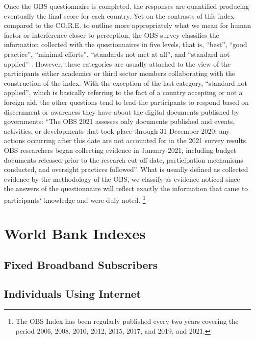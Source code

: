 \documentclass[a4paper, twoside]{report}
\let\oldfootnote\footnote
\renewcommand\footnote[1]{%
\oldfootnote{\hspace{2mm}#1}}
\begin{document}
Once the OBS questionnaire is completed, the responses are quantified producing eventually the final score for each country. Yet on the contrasts of this index compared to the CO.R.E. to outline more appropriately what we mean for human factor or interference closer to perception, the OBS survey classifies the information collected with the questionnaires in five levels, that is, ``best'', ``good practice'', ``minimal efforts'', ``standards not met at all'', and ``standard not applied'' \citep[p. 66]{open_budget}. However, these categories are usually attached to the view of the participants either academics or third sector members collaborating with the construction of the index. With the exception of the last category, ``standard not applied'', which is basically referring to the fact of a country accepting or not a foreign aid, the other questions tend to lead the participants to respond based on discernment or awareness they have about the digital documents published by governments: ``The OBS 2021 assesses only documents published and events, activities, or developments that took place through 31 December 2020; any actions occurring after this date are not accounted for in the 2021 survey results. OBS researchers began collecting evidence in January 2021, including budget documents released prior to the research cut-off date, participation mechanisms conducted, and oversight practices followed''. What is usually defined as collected evidence by the methodology of the OBS, we classify as evidence noticed since the answers of the questionnaire will reflect exactly the information that came to participants` knowledge and were duly noted.\footnote{The OBS Index has been regularly published every two years covering the period 2006, 2008, 2010, 2012, 2015, 2017, and 2019, and 2021.}        


\section*{World Bank Indexes}

\subsection*{Fixed Broadband Subscribers}

\subsection*{Individuals Using Internet}
\end{document}
